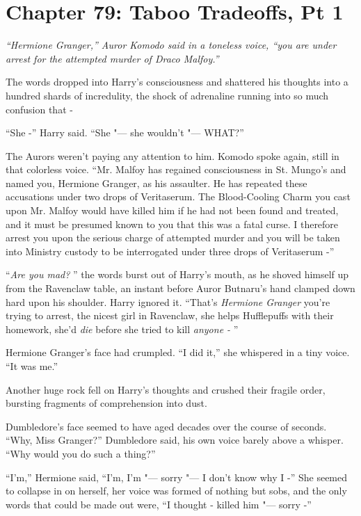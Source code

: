 \chapter{Chapter 79: Taboo Tradeoffs, Pt 1}
\emph{``Hermione Granger,'' Auror Komodo said in a toneless voice, ``you
are under arrest for the attempted murder of Draco Malfoy.''}

The words dropped into Harry's consciousness and shattered his thoughts
into a hundred shards of incredulity, the shock of adrenaline running
into so much confusion that -

``She -'' Harry said. ``She "--- she wouldn't "--- WHAT?''

The Aurors weren't paying any attention to him. Komodo spoke again,
still in that colorless voice. ``Mr. Malfoy has regained consciousness
in St. Mungo's and named you, Hermione Granger, as his assaulter. He has
repeated these accusations under two drops of Veritaserum. The
Blood-Cooling Charm you cast upon Mr. Malfoy would have killed him if he
had not been found and treated, and it must be presumed known to you
that this was a fatal curse. I therefore arrest you upon the serious
charge of attempted murder and you will be taken into Ministry custody
to be interrogated under three drops of Veritaserum -''

``\emph{Are you mad?} '' the words burst out of Harry's mouth, as he
shoved himself up from the Ravenclaw table, an instant before Auror
Butnaru's hand clamped down hard upon his shoulder. Harry ignored it.
``That's \emph{Hermione Granger} you're trying to arrest, the nicest girl
in Ravenclaw, she helps Hufflepuffs with their homework, she'd
\emph{die} before she tried to kill \emph{anyone -} ''

Hermione Granger's face had crumpled. ``I did it,'' she whispered in a
tiny voice. ``It was me.''

Another huge rock fell on Harry's thoughts and crushed their fragile
order, bursting fragments of comprehension into dust.

Dumbledore's face seemed to have aged decades over the course of
seconds. ``Why, Miss Granger?'' Dumbledore said, his own voice barely
above a whisper. ``Why would you do such a thing?''

``I'm,'' Hermione said, ``I'm, I'm "--- sorry "--- I don't know why I -'' She
seemed to collapse in on herself, her voice was formed of nothing but
sobs, and the only words that could be made out were, ``I thought -
killed him "--- sorry -''


